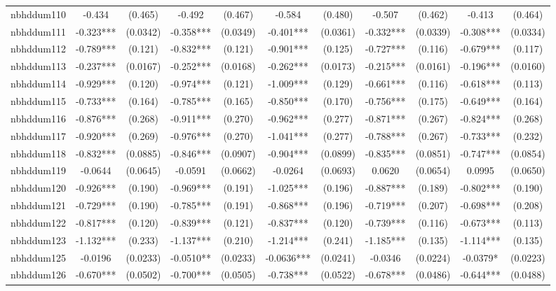 \documentclass[]{article}
\begin{document}
\begin{tabular}{lcccccccccc}
nbhddum110 & -0.434 & (0.465) & -0.492 & (0.467) & -0.584 & (0.480) & -0.507 & (0.462) & -0.413 & (0.464) \\
nbhddum111 & -0.323*** & (0.0342) & -0.358*** & (0.0349) & -0.401*** & (0.0361) & -0.332*** & (0.0339) & -0.308*** & (0.0334) \\
nbhddum112 & -0.789*** & (0.121) & -0.832*** & (0.121) & -0.901*** & (0.125) & -0.727*** & (0.116) & -0.679*** & (0.117) \\
nbhddum113 & -0.237*** & (0.0167) & -0.252*** & (0.0168) & -0.262*** & (0.0173) & -0.215*** & (0.0161) & -0.196*** & (0.0160) \\
nbhddum114 & -0.929*** & (0.120) & -0.974*** & (0.121) & -1.009*** & (0.129) & -0.661*** & (0.116) & -0.618*** & (0.113) \\
nbhddum115 & -0.733*** & (0.164) & -0.785*** & (0.165) & -0.850*** & (0.170) & -0.756*** & (0.175) & -0.649*** & (0.164) \\
nbhddum116 & -0.876*** & (0.268) & -0.911*** & (0.270) & -0.962*** & (0.277) & -0.871*** & (0.267) & -0.824*** & (0.268) \\
nbhddum117 & -0.920*** & (0.269) & -0.976*** & (0.270) & -1.041*** & (0.277) & -0.788*** & (0.267) & -0.733*** & (0.232) \\
nbhddum118 & -0.832*** & (0.0885) & -0.846*** & (0.0907) & -0.904*** & (0.0899) & -0.835*** & (0.0851) & -0.747*** & (0.0854) \\
nbhddum119 & -0.0644 & (0.0645) & -0.0591 & (0.0662) & -0.0264 & (0.0693) & 0.0620 & (0.0654) & 0.0995 & (0.0650) \\
nbhddum120 & -0.926*** & (0.190) & -0.969*** & (0.191) & -1.025*** & (0.196) & -0.887*** & (0.189) & -0.802*** & (0.190) \\
nbhddum121 & -0.729*** & (0.190) & -0.785*** & (0.191) & -0.868*** & (0.196) & -0.719*** & (0.207) & -0.698*** & (0.208) \\
nbhddum122 & -0.817*** & (0.120) & -0.839*** & (0.121) & -0.837*** & (0.120) & -0.739*** & (0.116) & -0.673*** & (0.113) \\
nbhddum123 & -1.132*** & (0.233) & -1.137*** & (0.210) & -1.214*** & (0.241) & -1.185*** & (0.135) & -1.114*** & (0.135) \\
nbhddum125 & -0.0196 & (0.0233) & -0.0510** & (0.0233) & -0.0636*** & (0.0241) & -0.0346 & (0.0224) & -0.0379* & (0.0223) \\
nbhddum126 & -0.670*** & (0.0502) & -0.700*** & (0.0505) & -0.738*** & (0.0522) & -0.678*** & (0.0486) & -0.644*** & (0.0488) \\

\end{tabular}
\end{document}
